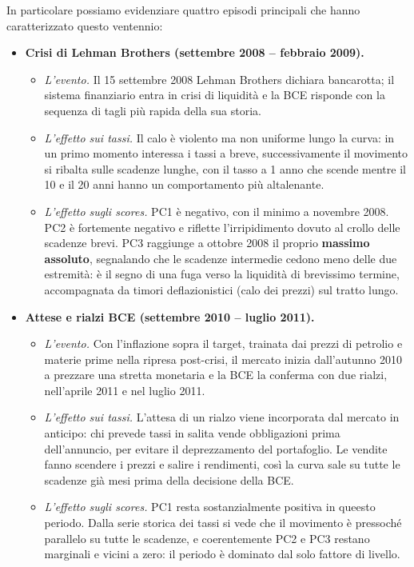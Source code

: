 \documentclass[11pt,a4paper]{article}
\theoremstyle{plain}
\theoremstyle{definition}
\theoremstyle{remark}
\begin{document}
In particolare possiamo evidenziare quattro episodi principali che hanno
caratterizzato questo ventennio:
\begin{itemize}
  \item \textbf{Crisi di Lehman Brothers (settembre 2008 -- febbraio 2009).}
\begin{itemize}
\item       \emph{L'evento.} Il 15 settembre 2008 Lehman Brothers dichiara
        bancarotta; il sistema finanziario entra in crisi di liquidità e la
        BCE risponde con la sequenza di tagli più rapida della sua storia.
\item          \emph{L'effetto sui tassi.} Il calo è violento ma non uniforme lungo
        la curva: in un primo momento interessa i tassi a breve,
        successivamente il movimento si ribalta sulle scadenze lunghe, con il
        tasso a 1 anno che scende mentre il 10 e il 20 anni
        hanno un comportamento più altalenante.
\item         \emph{L'effetto sugli scores.} PC1 è negativo, con il minimo a
        novembre 2008. PC2 è fortemente negativo e
        riflette l'irripidimento dovuto al crollo delle scadenze brevi. PC3
        raggiunge a ottobre 2008 il proprio \textbf{massimo assoluto},
        segnalando che le scadenze intermedie cedono meno delle due estremità:
        è il segno di una fuga verso la liquidità di brevissimo termine,
        accompagnata da timori deflazionistici (calo dei prezzi) sul tratto
        lungo.
\end{itemize}
 



  \item \textbf{Attese e rialzi BCE (settembre 2010 -- luglio 2011).}
\begin{itemize}
\item        \emph{L'evento.} Con l'inflazione sopra il target, trainata
        dai prezzi di petrolio e materie prime nella ripresa post-crisi, il
        mercato inizia dall'autunno 2010 a prezzare una stretta monetaria e
        la BCE la conferma con due rialzi, nell'aprile 2011 e nel luglio 2011.
\item        \emph{L'effetto sui tassi.} L'attesa di un rialzo viene incorporata dal
        mercato in anticipo: chi prevede tassi in salita vende
        obbligazioni prima dell'annuncio, per evitare il deprezzamento del
        portafoglio. Le vendite fanno scendere i prezzi e salire i rendimenti,
        così la curva sale su tutte le scadenze già mesi prima della decisione
        della BCE.
\item        \emph{L'effetto sugli scores.} PC1 resta sostanzialmente positiva in queesto periodo.
         Dalla serie storica dei
        tassi si vede che il movimento è pressoché parallelo su tutte le
        scadenze, e coerentemente PC2 e PC3 restano marginali e vicini a zero:
        il periodo è dominato dal solo fattore di livello.
\end{itemize}


\end{itemize}
\end{document}
